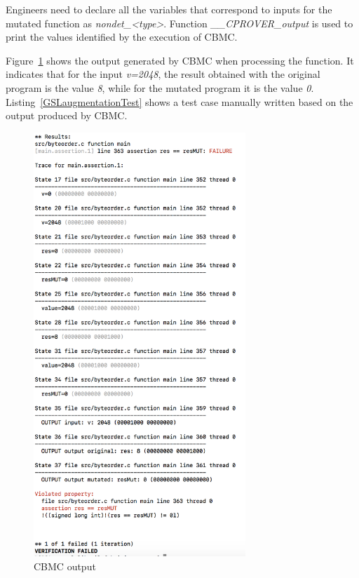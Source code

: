 Engineers need to declare all the variables that correspond to inputs for the mutated function as \emph{nondet\_<type>}. Function \emph{\_\_CPROVER\_output} is used to print the values identified by the execution of CBMC.

Figure~\ref{fig:cbmcOutput} shows the output generated by CBMC when processing the function. It indicates that for the input \emph{v=2048}, the result obtained with the original program is the value \emph{8}, while for the mutated program it is the value \emph{0}. Listing~\ref{GSLaugmentationTest} shows a test case manually written based on the output produced by CBMC.

\begin{figure}[h]
\begin{center}
\includegraphics[width=8cm]{images/CBMCoutput}
\caption{CBMC output}
\label{fig:cbmcOutput}
\end{center}
\end{figure}



\clearpage



